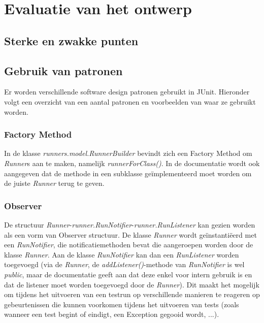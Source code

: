 \documentclass[i1]{oss}
\begin{document}
\section{Evaluatie van het ontwerp}


\subsection{Sterke en zwakke punten}

\subsection{Gebruik van patronen}

Er worden verschillende software design patronen gebruikt in JUnit. 
Hieronder volgt een overzicht van een aantal patronen en voorbeelden van waar ze gebruikt worden.

\subsubsection{Factory Method}
In de klasse \emph{runners.model.RunnerBuilder} bevindt zich een Factory Method om \emph{Runner}s aan te maken, namelijk \emph{runnerForClass()}. 
In de documentatie wordt ook aangegeven dat de methode in een subklasse ge\"implementeerd moet worden om de juiste \emph{Runner} terug te geven.

\subsubsection{Observer}
De structuur \emph{Runner}-\emph{runner.RunNotifier}-\emph{runner.RunListener} kan gezien worden als een vorm van Observer structuur. 
De klasse \emph{Runner} wordt ge\"instanti\"eerd met een \emph{RunNotifier}, die notificatiemethoden bevat die aangeroepen worden door de klasse \emph{Runner}. 
Aan de klasse \emph{RunNotifier} kan dan een \emph{RunListener} worden toegevoegd (via de \emph{Runner}, de \emph{addListener()}-methode van \emph{RunNotifier} is wel \emph{public}, maar de documentatie geeft aan dat deze enkel voor intern gebruik is en dat de listener moet worden toegevoegd door de \emph{Runner}). 
Dit maakt het mogelijk om tijdens het uitvoeren van een testrun op verschillende manieren te reageren op gebeurtenissen die kunnen voorkomen tijdens het uitvoeren van tests (zoals wanneer een test begint of eindigt, een Exception gegooid wordt, ...).
\end{document}
